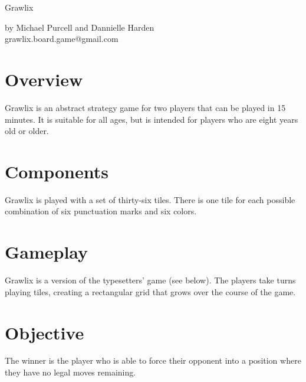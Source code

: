 \documentclass[a4paper, DIV=15]{scrartcl}
\begin{document}
\thispagestyle{empty}
\enlargethispage{4\baselineskip} %


{
\begin{center}
\setmainfont[Scale=3.0]{Cooper Black}
\Huge
Grawlix
\end{center}
}
{
\begin{center}
\setmainfont{Quicksand-Medium}
\noindent{}\Large{}by Michael Purcell and Dannielle Harden\\grawlix.board.game@gmail.com
\end{center}
}

\smallskip
\begin{multicols}{2}
\section*{Overview}
Grawlix is an abstract strategy game for two players that can be played in 15 minutes. It is suitable for all ages, but is intended for players who are eight years old or older.

\section*{Components}
Grawlix is played with a set of thirty-six tiles. There is one tile for each possible combination of six punctuation marks and six colors.

\section*{Gameplay}
Grawlix is a version of the typesetters' game (see below). The players take turns playing tiles, creating a rectangular grid that grows over the course of the game.

\section*{Objective}
The winner is the player who is able to force their opponent into a position where they have no legal moves remaining.
\end{multicols}

\begin{center}
\end{center}
\end{document}
